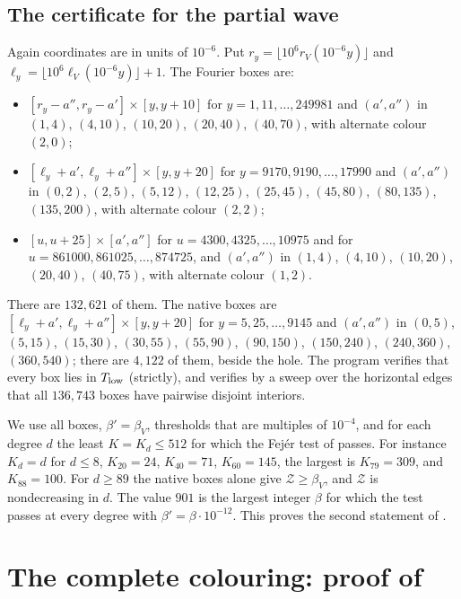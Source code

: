 \documentclass[11pt,colorlinks]{charlie}
\begin{document}
\subsection{The certificate for the partial wave}\label{sec:starV}
Again coordinates are in units of $10^{-6}$. Put $r_y=\lfloor10^6r_V(10^{-6}y)\rfloor$ and $\ell_y=\lfloor10^6\ell_V(10^{-6}y)\rfloor+1$. The Fourier boxes are:
\begin{itemize}
\item $[r_y-a'',r_y-a']\times[y,y+10]$ for $y=1,11,\dots,249981$ and $(a',a'')$ in $(1,4)$, $(4,10)$, $(10,20)$, $(20,40)$, $(40,70)$, with alternate colour $(2,0)$;
\item $[\ell_y+a',\ell_y+a'']\times[y,y+20]$ for $y=9170,9190,\dots,17990$ and $(a',a'')$ in $(0,2)$, $(2,5)$, $(5,12)$, $(12,25)$, $(25,45)$, $(45,80)$, $(80,135)$, $(135,200)$, with alternate colour $(2,2)$;
\item $[u,u+25]\times[a',a'']$ for $u=4300,4325,\dots,10975$ and for $u=861000,861025,\dots,874725$, and $(a',a'')$ in $(1,4)$, $(4,10)$, $(10,20)$, $(20,40)$, $(40,75)$, with alternate colour $(1,2)$.
\end{itemize}
There are $132{,}621$ of them. The native boxes are $[\ell_y+a',\ell_y+a'']\times[y,y+20]$ for $y=5,25,\dots,9145$ and $(a',a'')$ in $(0,5)$, $(5,15)$, $(15,30)$, $(30,55)$, $(55,90)$, $(90,150)$, $(150,240)$, $(240,360)$, $(360,540)$; there are $4{,}122$ of them, beside the hole. The program verifies that every box lies in $T_{\rm low}$ (strictly), and verifies by a sweep over the horizontal edges that all $136{,}743$ boxes have pairwise disjoint interiors.

We use all boxes, $\beta'=\beta_V$, thresholds that are multiples of $10^{-4}$, and for each degree $d$ the least $K=K_d\le512$ for which the Fej\'er test of  passes. For instance $K_d=d$ for $d\le8$, $K_{20}=24$, $K_{40}=71$, $K_{60}=145$, the largest is $K_{79}=309$, and $K_{88}=100$. For $d\ge89$ the native boxes alone give $\mathcal Z\ge\beta_V$, and $\mathcal Z$ is nondecreasing in $d$. The value $901$ is the largest integer $\beta$ for which the test passes at every degree with $\beta'=\beta\cdot10^{-12}$. This proves the second statement of .

\section{The complete colouring: proof of }\label{sec:edges}
\end{document}

